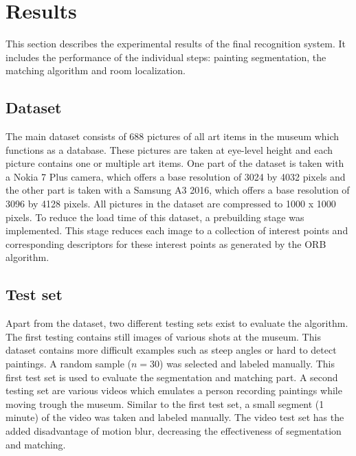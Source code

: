 \section{Results}
\label{sec:results}
This section describes the experimental results of the final recognition system. It includes the performance of the individual steps: painting segmentation, the matching algorithm and room localization. 


\subsection{Dataset}
The main dataset consists of 688 pictures of all art items in the museum which functions as a database. These pictures are taken at eye-level height and each picture contains one or multiple art items. One part of the dataset is taken with a Nokia 7 Plus camera, which offers a base resolution of 3024 by 4032 pixels and the other part is taken with a Samsung A3 2016, which offers a base resolution of 3096 by 4128 pixels. All pictures in the dataset are compressed to 1000 x 1000 pixels. To reduce the load time of this dataset, a prebuilding stage was implemented. This stage reduces each image to a collection of interest points and corresponding descriptors for these interest points as generated by the ORB \cite{Rublee2011} algorithm. 

\subsection{Test set}
Apart from the dataset, two different testing sets exist to evaluate the algorithm. The first testing contains still images of various shots at the museum. This dataset contains more difficult examples such as steep angles or hard to detect paintings. A random sample ($n = 30$) was selected and labeled manually. This first test set is used to evaluate the segmentation and matching part. A second testing set are various videos which emulates a person recording paintings while moving trough the museum. Similar to the first test set, a small segment (1 minute) of the video was taken and labeled manually. The video test set has the added disadvantage of motion blur, decreasing the effectiveness of segmentation and matching.


